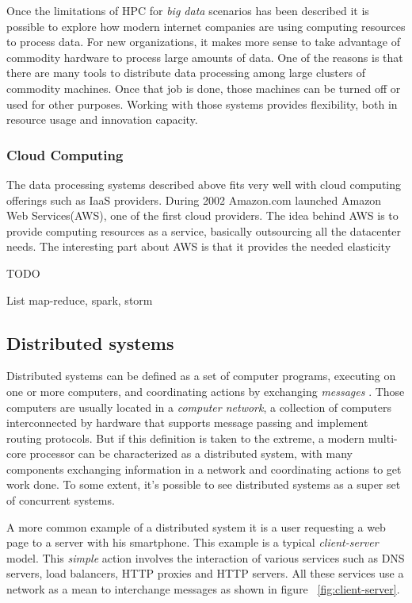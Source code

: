 Once the limitations of HPC for \textit{big data} scenarios has been described
it is possible to explore how modern internet companies are using computing
resources to process data. For new organizations, it makes more sense to take
advantage of commodity hardware to process large amounts of data. One of the
reasons is that there are many tools to distribute data processing among large
clusters of commodity machines. Once that job is done, those machines can be
turned off or used for other purposes. Working with those systems provides
flexibility, both in resource usage and innovation capacity. 

\subsubsection{Cloud Computing}

The data processing systems described above fits very well with cloud computing
offerings such as IaaS providers.
During 2002 Amazon.com launched Amazon Web Services(AWS), one of the first cloud
providers. The idea behind AWS is to provide computing resources as a service, basically
outsourcing all the datacenter needs. The interesting part about AWS is that it provides
the needed elasticity 

TODO

List map-reduce, spark, storm

\subsection{Distributed systems}
\label{subsection:distsys}

Distributed systems can be defined as a set of computer programs, executing on
one or more computers, and coordinating actions by exchanging \textit{messages}
\cite{GuideReliable}. Those computers are usually located in a \textit{computer
  network}, a collection of computers interconnected by hardware that supports
message passing and implement routing protocols. But if this definition is taken
to the extreme, a modern multi-core processor can be characterized as a
distributed system, with many components exchanging information in a network and
coordinating actions to get work done. To some extent, it's possible to see
distributed systems as a super set of concurrent systems.

A more common example of a distributed system it is a user requesting a web page to
a server with his smartphone. This example is a typical \textit{client-server}
model. This \textit{simple} action involves the interaction of various services
such as DNS servers, load balancers, HTTP proxies and HTTP servers. All these
services use a network as a mean to interchange messages as shown in figure
~\ref{fig:client-server}.

